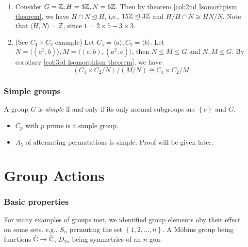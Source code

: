 \documentclass[10pt]{article}
\def\le{\leqslant}
\def\ltrigeq{\trianglelefteq}
\begin{document}
    \begin{example}
        \begin{enumerate}
            \item Consider $ G= \mathbb{Z} ,H=3{\mathbb{Z}}, N=5{\mathbb{Z}} $. Then by theorem \ref{col:2nd Isomorhpism theorem}, we have $ H \cap N \ltrigeq H $, i,e., $ 15\bbZ \ltrigeq 3\bbZ $ and $ H/H\cap N \cong HN/N $. Note that $ \langle H,N \rangle =\mathbb{Z} $, since $1=2\times 5-3\times 3$.
            \item (See $ C_4 \times C_2 $ example) Let $ C_4=\langle a \rangle , C_2=\langle b \rangle $. Let $ N=\langle (a^2,b) \rangle, M=\langle (e,b),(a^2,e) \rangle $, then $ N \le M\le G $ and $ N,M \ltrigeq G $. By corollary \ref{col:3rd Isomorphism theorem}, we have 
            \[
                (C_4 \times C_2 / N)/ (M/N)\cong C_4 \times C_2 / M
            .\]
        \end{enumerate}
    \end{example}
    \section{Simple groups}
    \begin{definition}
        A group $G$ is \textit{simple} if and only if its only normal subgroups are $ \left\{ e\right\} $ and $G$.
    \end{definition}
    \begin{example}
        \begin{itemize}
            \item $ C_p $ with $p$ prime is a simple group.
            \item $ A_5 $ of alternating permutations is simple. Proof will be given later.
        \end{itemize}
    \end{example}
    \part{Group Actions}
    \section{Basic properties}
        For many examples of groups met, we identified group elements oby their effect on some sets. e.g., $S_n$ permuting the set $ \left\{ 1,2,\dots,n\right\} $. A M\"{o}bius group being functions $ \hat{\mathbb{C}}\to \hat{{\mathbb{C}}} $, $ D_{2n} $ being symmetries of an $n$-gon.
\end{document}
